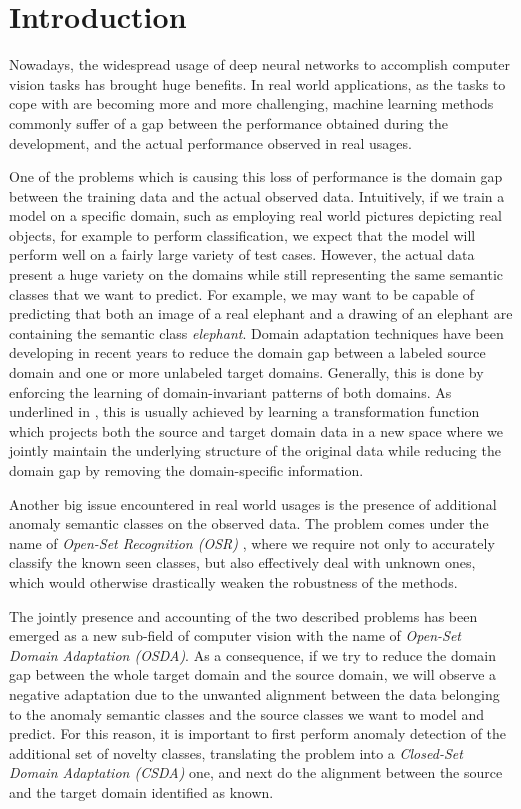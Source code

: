 \documentclass[10pt,twocolumn,letterpaper]{article}
\begin{document}
\section{Introduction}
\label{sec:intro}
Nowadays, the widespread usage of deep neural networks to accomplish computer vision tasks has brought huge benefits.
In real world applications, as the tasks to cope with are becoming more and more challenging, machine learning methods commonly suffer of a gap between the performance
obtained during the development, and the actual performance observed in real usages. 

One of the problems which is causing this loss of performance is the domain gap between the training data and the actual observed data. Intuitively, if we train a model on a specific domain,
such as employing real world pictures depicting real objects, for example to perform classification, we expect that the model will perform well on a fairly large variety of test cases.
However, the actual data present a huge variety on the domains while still representing the same semantic classes that we want to predict.
For example, we may want to be capable of predicting that both an image of a real elephant and a drawing of an elephant are containing the semantic class \textit{elephant}.
Domain adaptation techniques have been developing in recent years to reduce the domain gap between a labeled source domain and one or more unlabeled target domains.
Generally, this is done by enforcing the learning of domain-invariant patterns of both domains.
As underlined in \cite{domainAdaptFarahani}, this is usually achieved by learning a transformation function which projects both the source and target domain data in a
new space where we jointly maintain the underlying structure of the original data while reducing the domain gap by removing the domain-specific information.

Another big issue encountered in real world usages is the presence of additional anomaly semantic classes on the observed data.
The problem comes under the name of \textit{Open-Set Recognition (OSR)} \cite{OSRsurvey}, where we require not only to accurately classify the known seen classes, but also
effectively deal with unknown ones, which would otherwise drastically weaken the robustness of the methods.

The jointly presence and accounting of the two described problems has been emerged as a new sub-field of computer vision with the name of \textit{Open-Set Domain Adaptation (OSDA)}.
As a consequence, if we try to reduce the domain gap between the whole target domain and the source domain, we will observe a negative adaptation due to the unwanted alignment between
the data belonging to the anomaly semantic classes and the source classes we want to model and predict.
For this reason, it is important to first perform anomaly detection of the additional set of novelty classes, translating the problem into a \textit{Closed-Set Domain Adaptation (CSDA)} one,
and next do the alignment between the source and the target domain identified as known.
\end{document}
